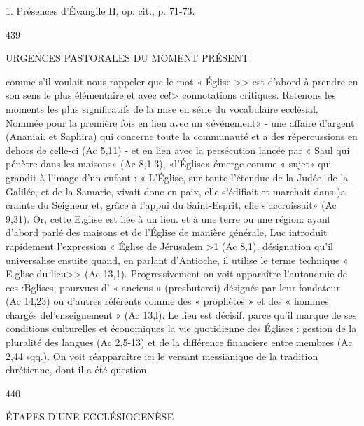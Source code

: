 1.	Présences d'Évangile II, op. cit., p. 71-73.

439
 
URGENCES PASTORALES DU MOMENT PRÉSENT

comme s'il voulait nous rappeler que le mot « Église >> est d'abord à prendre en son sens le plus élémentaire et avec ce!> connotations critiques.
Retenons les moments les plus significatifs de la mise en
série du vocabulaire ecclésial. Nommée pour la première fois en lien avec un «événement» -	une affaire d'argent (Ananiai. et Saphira) qui concerne toute la communauté et a des répercussions en dehors de celle-ci (Ac 5,11) -	et en lien avec la persécution lancée par « Saul qui pénètre dans les maisons» (Ac 8,1.3), «l'Église» émerge comme « sujet» qui grandit à l'image d'un enfant : « L'Église, sur toute l'étendue de la Judée, de la Galilée, et de la Samarie, vivait donc en paix, elle s'édifiait et marchait dans )a crainte du Seigneur et, grâce à l'appui du Saint-Esprit, elle s'accroissait» (Ac 9,31).
Or, cette E.glise est liée à un lieu. et à une terre ou une région:
ayant d'abord parlé des maisons et de l'Église de manière générale, Luc introduit rapidement l'expression « Église de Jérusalem >1 (Ac 8,1), désignation qu'il universalise ensuite quand, en parlant d'Antioche, il utilise le terme technique « E.glise du lieu>> (Ac 13,1). Progressivement on voit apparaître l'autonomie de ces :Bglises, pourvues d' « anciens » (presbuteroi) désignés par leur fondateur (Ac 14,23) ou d'autres référents comme des « prophètes » et des « hommes chargés del'enseignement » (Ac 13,l). Le lieu est décisif, parce qu'il marque de ses conditions culturelles et économiques la vie quotidienne des Églises : gestion de la pluralité des langues (Ac 2,5-13) et de la différence financiere entre membres (Ac 2,44 sqq.). On voit réapparaître ici le versant messianique de la tradition chrétienne, dont il a été question

440
 
ÉTAPES D'UNE ECCLÉSIOGENÈSE


